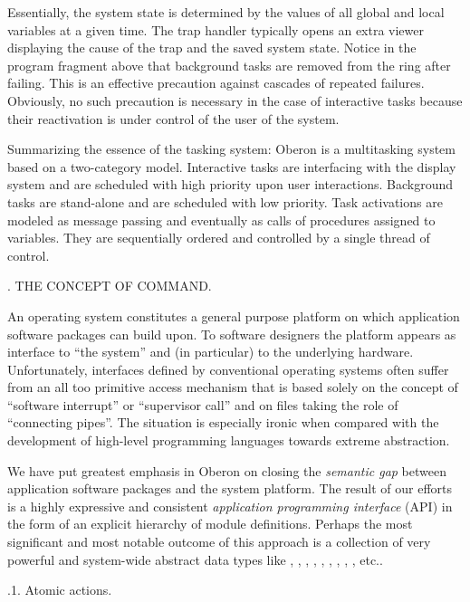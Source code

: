 \noindent Essentially, the system state is determined by the values of all
global and local variables at a given time. The trap handler typically
opens an extra viewer displaying the cause of the trap and the saved
system state. Notice in the program fragment above that background
tasks are removed from the ring after failing. This is an effective
precaution against cascades of repeated failures. Obviously, no such
precaution is necessary in the case of interactive tasks because their
reactivation is under control of the user of the system.

Summarizing the essence of the tasking system: Oberon is a
multitasking system based on a two-category model. Interactive tasks
are interfacing with the display system and are scheduled with high
priority upon user interactions. Background tasks are stand-alone and
are scheduled with low priority. Task activations are modeled as
message passing and eventually as calls of procedures assigned to
variables. They are sequentially ordered and controlled by a single
thread of control.

. THE CONCEPT OF COMMAND.

An operating system constitutes a general purpose platform on which
application software packages can build upon. To software designers
the platform appears as interface to ``the system'' and (in particular)
to the underlying hardware. Unfortunately, interfaces defined by
conventional operating systems often suffer from an all too primitive
access mechanism that is based solely on the concept of ``software interrupt''
or ``supervisor call'' and on files taking the role of
``connecting pipes''. The situation is especially ironic when compared
with the development of high-level programming languages towards
extreme abstraction.

We have put greatest emphasis in Oberon on closing the \emph{semantic gap}
between application software packages and the system platform. The
result of our efforts is a highly expressive and consistent
\emph{application programming interface} (API) in the form of an explicit
hierarchy of module definitions. Perhaps the most significant and most
notable outcome of this approach is a collection of very powerful and
system-wide abstract data types like
, , , , ,
, , , ,  etc..

.1. Atomic actions.

